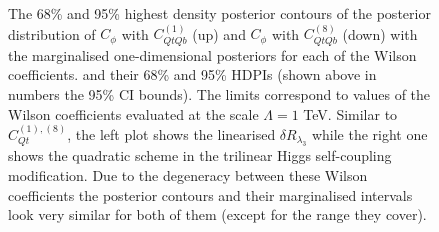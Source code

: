 \begin{figure}[h!]
\begin{center}
	\end{center}
	\caption{The 68\% and 95\% highest density posterior contours of the posterior distribution of $C_\phi$ with $C_{QtQb}^{(1)}$ (up) and $C_\phi$ with $C_{QtQb}^{(8)}$ (down) with the marginalised one-dimensional posteriors for each of the Wilson coefficients. and their 68\% and 95\% HDPIs (shown above in numbers the 95\% CI bounds). 
		The limits correspond to values of the Wilson coefficients evaluated at the scale $\Lambda=1$ TeV. 
		Similar to $C_{Qt}^{(1),(8)}$, the left plot shows the linearised  $\delta R_{\lambda_3}$ while the right one shows the quadratic scheme in the trilinear Higgs self-coupling modification. Due to the degeneracy between these Wilson coefficients the posterior contours and their marginalised intervals look very similar for both of them (except for the range they cover).  \label{2param-cqtqb} }
\end{figure}

